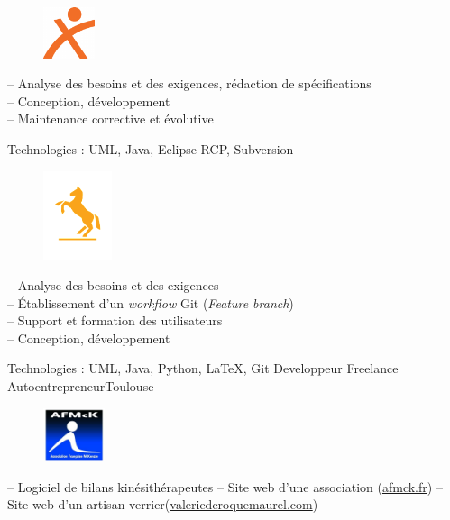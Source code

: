 \documentclass{my_cv_bis}
\begin{document}
{
	\vspace{-0.4cm}
	\begin{figure}
		\vspace{-0.5cm}
		\includegraphics[width=1.5cm]{images/logos/extia.png}
	\end{figure}	
	-- Analyse des besoins et des exigences, rédaction de spécifications\\
	-- Conception, développement\\ 
	-- Maintenance corrective et évolutive 
}
{
	Technologies : UML, Java, Eclipse RCP, Subversion 
	\vspace{15px}
	}
{
	\vspace{-0.4cm}
	\begin{figure}
		\vspace{-1cm}
		\includegraphics[width=2cm]{images/logos/continental.png}
	\end{figure}	
-- Analyse des besoins et des exigences\\
-- Établissement d'un \textit{workflow} Git (\textit{Feature branch})\\
-- Support et formation des utilisateurs\\
-- Conception, développement 
}
{
	Technologies : UML, Java, Python, \LaTeX, Git 
	\vspace{15px}
}
	{Developpeur Freelance}
	{Autoentrepreneur}{Toulouse}
	{
	\vspace{-0.4cm}
	\begin{figure}
		\vspace{-0.4cm}
		\includegraphics[width=1.8cm]{images/logos/afmck.jpg}
	\end{figure}	
		-- Logiciel de bilans kinésithérapeutes\newline
		-- Site web d'une association (\url{afmck.fr})\newline
		-- Site web d'un artisan verrier(\url{valeriederoquemaurel.com})\newline
	}
\end{document}
